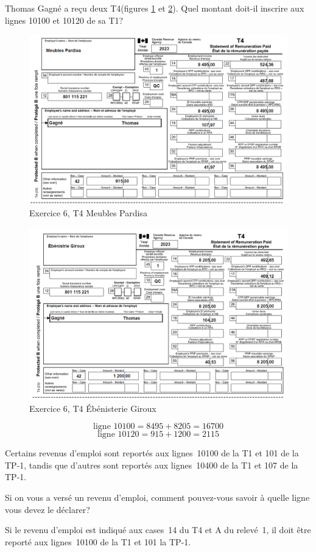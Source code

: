\begin{question}
	 Thomas Gagné a reçu deux T4(figures \ref{fig:Chap2Exercice6Q2T4numero1} et \ref{fig:Chap2Exercice6Q2T4numero2}). Quel montant doit-il inscrire aux lignes 10100 et 10120 de sa T1?
	\begin{figure}
		\centering
		\includegraphics[width=.9\textwidth]{exercice/2-6/Q2/T4-1.png}
		\caption{Exercice 6, T4 Meubles Pardisa}
		\label{fig:Chap2Exercice6Q2T4numero1}
	\end{figure}
	\begin{figure}
		\centering
		\includegraphics[width=.9\textwidth]{exercice/2-6/Q2/T4-2.png}
		\caption{Exercice 6, T4 Ébénisterie Giroux}
		\label{fig:Chap2Exercice6Q2T4numero2}
	\end{figure}
\end{question}
\[ \text{ligne~10100} = 8495 + 8205 = 16700\]
\[ \text{ligne~10120} = 915 + 1200 = 2115\]

\begin{question}
	Certains revenus d'emploi sont reportés aux lignes~10100 de la T1 et 101 de la TP-1, tandis que d'autres sont reportés aux lignes~10400 de la T1 et 107 de la TP-1. 
	
	Si on vous a versé un revenu d'emploi, comment pouvez-vous savoir à quelle ligne vous devez le déclarer?
\end{question}
Si le revenu d'emploi est indiqué aux cases~14 du T4 et A du relevé~1, il doit être reporté aux lignes~10100 de la T1 et 101 la TP-1.

